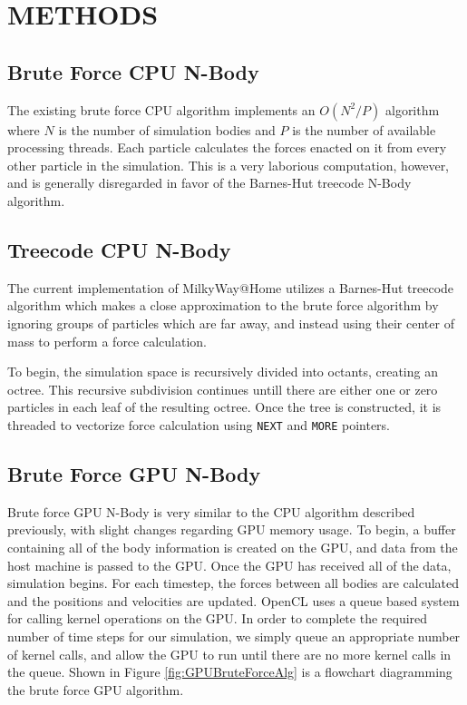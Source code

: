 \documentclass{thesis}
\begin{document}
\chapter{METHODS}
\section{Brute Force CPU N-Body}
The existing brute force CPU algorithm implements an $O(N^2/P)$ algorithm where $N$ is the number of simulation bodies and $P$ is the number of available processing threads. Each particle calculates the forces enacted on it from every other particle in the simulation. This is a very laborious computation, however, and is generally disregarded in favor of the Barnes-Hut treecode N-Body algorithm.
\section{Treecode CPU N-Body}
The current implementation of MilkyWay@Home utilizes a Barnes-Hut treecode algorithm which makes a close approximation to the brute force algorithm by ignoring groups of particles which are far away, and instead using their center of mass to perform a force calculation.

To begin, the simulation space is recursively divided into octants, creating an octree. This recursive subdivision continues untill there are either one or zero particles in each leaf of the resulting octree. Once the tree is constructed, it is threaded to vectorize force calculation using \texttt{NEXT} and \texttt{MORE} pointers.
\section{Brute Force GPU N-Body}
Brute force GPU N-Body is very similar to the CPU algorithm described previously, with slight changes regarding GPU memory usage. To begin, a buffer containing all of the body information is created on the GPU, and data from the host machine is passed to the GPU. Once the GPU has received all of the data, simulation begins. For each timestep, the forces between all bodies are calculated and the positions and velocities are updated. OpenCL uses a queue based system for calling kernel operations on the GPU. In order to complete the required number of time steps for our simulation, we simply queue an appropriate number of kernel calls, and allow the GPU to run until there are no more kernel calls in the queue. Shown in Figure \ref{fig:GPUBruteForceAlg} is a flowchart diagramming the brute force GPU algorithm.
\end{document}
